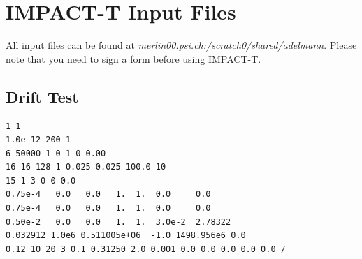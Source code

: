 \documentclass{psi-note}    %
\begin{document}






\section{IMPACT-T Input Files}
All input files can be found at {\em merlin00.psi.ch:/scratch0/shared/adelmann}.
Please note that you need to sign a form before using IMPACT-T.

\subsection{Drift Test}
\begin{verbatim}
1 1
1.0e-12 200 1
6 50000 1 0 1 0 0.00
16 16 128 1 0.025 0.025 100.0 10
15 1 3 0 0 0.0
0.75e-4   0.0   0.0   1.  1.  0.0     0.0
0.75e-4   0.0   0.0   1.  1.  0.0     0.0
0.50e-2   0.0   0.0   1.  1.  3.0e-2  2.78322
0.032912 1.0e6 0.511005e+06  -1.0 1498.956e6 0.0
0.12 10 20 3 0.1 0.31250 2.0 0.001 0.0 0.0 0.0 0.0 0.0 /
\end{verbatim}
\end{document}
